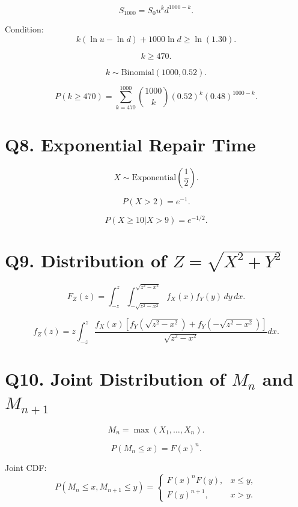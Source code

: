 \documentclass[12pt]{article}
\begin{document}
\[
S_{1000}=S_0 u^k d^{1000-k}.
\]

Condition:
\[
k(\ln u-\ln d)+1000\ln d \ge \ln(1.30).
\]

\[
k\ge470.
\]

\[
k\sim \text{Binomial}(1000,0.52).
\]

\[
P(k\ge470)=\sum_{k=470}^{1000}
\binom{1000}{k}(0.52)^k(0.48)^{1000-k}.
\]

\section*{Q8. Exponential Repair Time}

\[
X\sim \text{Exponential}\left(\frac12\right).
\]

\[
P(X>2)=e^{-1}.
\]

\[
P(X\ge10|X>9)=e^{-1/2}.
\]

\section*{Q9. Distribution of $Z=\sqrt{X^2+Y^2}$}

\[
F_Z(z)=\int_{-z}^{z}
\int_{-\sqrt{z^2-x^2}}^{\sqrt{z^2-x^2}}
f_X(x)f_Y(y)\,dy\,dx.
\]

\[
f_Z(z)=
z\int_{-z}^{z}
\frac{f_X(x)\left[f_Y(\sqrt{z^2-x^2})+f_Y(-\sqrt{z^2-x^2})\right]}
{\sqrt{z^2-x^2}}
dx.
\]

\section*{Q10. Joint Distribution of $M_n$ and $M_{n+1}$}

\[
M_n=\max(X_1,\dots,X_n).
\]

\[
P(M_n\le x)=F(x)^n.
\]

Joint CDF:
\[
P(M_n\le x, M_{n+1}\le y)=
\begin{cases}
F(x)^n F(y), & x\le y,\\
F(y)^{n+1}, & x>y.
\end{cases}
\]
\end{document}
